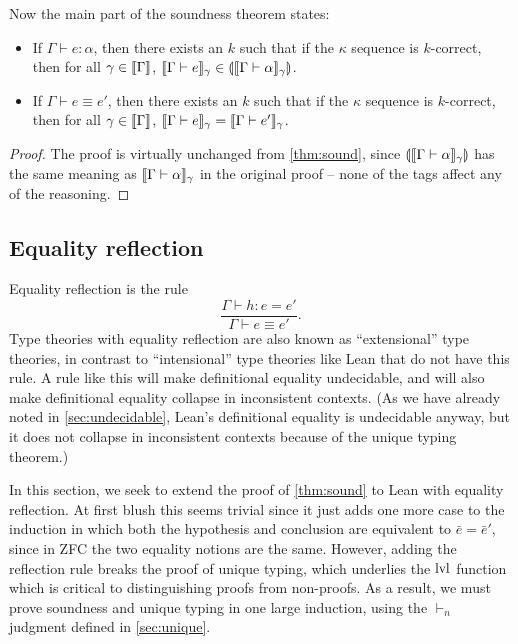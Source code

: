 Now the main part of the soundness theorem states:
\begin{theorem}[Soundness]\label{thm:sound2}
\begin{itemize}
\item If $\Gamma\vdash e:\alpha$, then there exists an $k$ such that if the $\kappa$ sequence is $k$-correct, then for all $\gamma\in\scott{\Gamma}$, $\scott{\Gamma\vdash e}_\gamma\in \ttag{\scott{\Gamma\vdash \alpha}_\gamma}$.
\item If $\Gamma\vdash e\equiv e'$, then there exists an $k$ such that if the $\kappa$ sequence is $k$-correct, then for all $\gamma\in\scott{\Gamma}$, $\scott{\Gamma\vdash e}_\gamma=\scott{\Gamma\vdash e'}_\gamma$.
\end{itemize}
\end{theorem}
\begin{proof}
The proof is virtually unchanged from \autoref{thm:sound}, since $\ttag{\scott{\Gamma\vdash \alpha}_\gamma}$ has the same meaning as $\scott{\Gamma\vdash \alpha}_\gamma$ in the original proof -- none of the tags affect any of the reasoning.
\end{proof}

\subsection{Equality reflection}
Equality reflection is the rule
$$\frac{\Gamma\vdash h:e=e'}{\Gamma\vdash e\equiv e'}.$$
Type theories with equality reflection are also known as ``extensional'' type theories, in contrast to ``intensional'' type theories like Lean that do not have this rule. A rule like this will make definitional equality undecidable, and will also make definitional equality collapse in inconsistent contexts. (As we have already noted in \autoref{sec:undecidable}, Lean's definitional equality is undecidable anyway, but it does not collapse in inconsistent contexts because of the unique typing theorem.)

In this section, we seek to extend the proof of \autoref{thm:sound} to Lean with equality reflection. At first blush this seems trivial since it just adds one more case to the induction in which both the hypothesis and conclusion are equivalent to $\bar e=\bar e'$, since in ZFC the two equality notions are the same. However, adding the reflection rule breaks the proof of unique typing, which underlies the $\operatorname{lvl}$ function which is critical to distinguishing proofs from non-proofs. As a result, we must prove soundness and unique typing in one large induction, using the $\vdash_n$ judgment defined in \autoref{sec:unique}.

